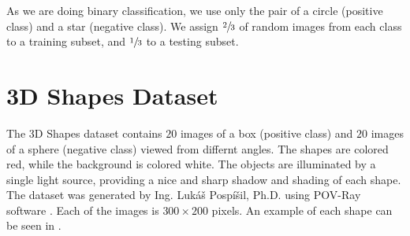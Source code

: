 As we are doing binary classification, we use only the pair of a circle (positive class) and a star (negative class). We assign $\sfrac{2}{3}$ of random images from each class to a training subset, and $\sfrac{1}{3}$ to a testing subset.

\section{3D Shapes Dataset}
The 3D Shapes dataset contains $20$ images of a box (positive class) and $20$ images of a sphere (negative class) viewed from differnt angles. The shapes are colored red, while the background is colored white. The objects are illuminated by a single light source, providing a nice and sharp shadow and shading of each shape. The dataset was generated by Ing. Lukáš Pospíšil, Ph.D. using POV-Ray software \cite{povray}. Each of the images is $300\times200$ pixels. An example of each shape can be seen in .
